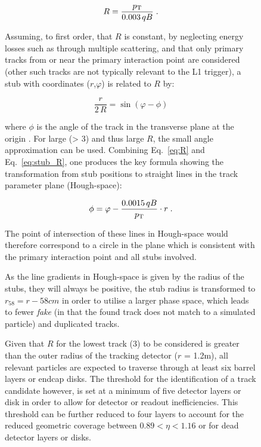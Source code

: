 \begin{figure}[tb]
\begin{equation}
R = \frac{p_{\mathrm{T}}}{0.003\,qB} \;.
\label{eq:R}
\end{equation}

Assuming, to first order, that $R$ is constant, by neglecting energy losses such as through multiple scattering, and that only primary tracks from or near the primary interaction point are considered (other such tracks are not typically relevant to the L1 trigger), a stub with coordinates ($r$,$\varphi$) is related to $R$ by:

\begin{equation}
\frac r{2\,R} = \sin\left(\varphi-\phi\right)
\label{eq:stub_R}
\end{equation}

where $\phi$ is the angle of the track in the transverse plane at the origin \cite{markthesis}. 
For large \pT (> 3\GeV) and thus large $R$, the small angle approximation can be used. Combining Eq.~\ref{eq:R} and Eq.~\ref{eq:stub_R}, one produces the key formula showing the transformation from stub positions to straight lines in the track parameter plane (Hough-space):

\begin{equation}
\phi = \varphi - \frac{0.0015\,qB}{p_{\mathrm{T}}}\cdot r \;.
\label{eq:localHT}
\end{equation}

The point of intersection of these lines in Hough-space would therefore correspond to a circle in the \rphi plane which is consistent with the primary interaction point and all stubs involved.

As the line gradients in Hough-space is given by the radius of the stubs, they will always be positive, the stub radius is transformed to $r_{58} = r - 58cm$ in order to utilise a larger phase space, which leads to fewer \textit{fake} (in that the found track does not match to a simulated particle) and duplicated tracks.

Given that $R$ for the lowest \pT track (3\GeV) to be considered is greater than the outer radius of the tracking detector ($r$ = 1.2m), all relevant particles are expected to traverse through at least six barrel layers or endcap disks. 
The threshold for the identification of a track candidate however, is set at a minimum of five detector layers or disk in order to allow for detector or readout inefficiencies. 
This threshold can be further reduced to four layers to account for the reduced geometric coverage between $0.89 < \eta < 1.16$ or for dead detector layers or disks.


\end{figure}
